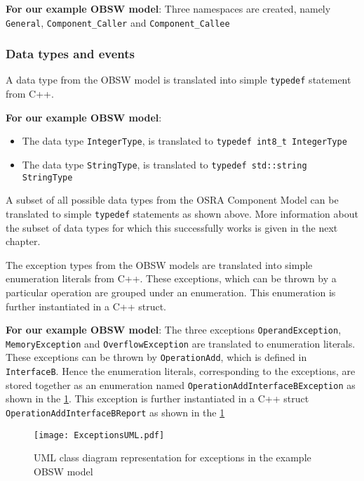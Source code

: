 \textbf{For our example OBSW model}: Three namespaces are created, namely \texttt{General}, \texttt{Component\_Caller} and \texttt{Component\_Callee} 

\subsubsection{\textbf{Data types and events}}
A data type from the OBSW model is translated into simple \texttt{typedef} statement from C++.

\textbf{For our example OBSW model}:
\begin{itemize}
\item The data type \texttt{IntegerType}, is translated to \texttt{typedef\allowbreak \ int8\_t IntegerType}
\item The data type \texttt{StringType}, is translated to \texttt{typedef\allowbreak \ std::string StringType} 
\end{itemize}

A subset of all possible data types from the OSRA Component Model can be translated to simple \texttt{typedef} statements as shown above. More information about the subset of data types for which this successfully works is given in the next chapter. 

The exception types from the OBSW models are translated into simple enumeration literals from C++. These exceptions, which can be thrown by a particular operation are grouped under an enumeration. This enumeration is further instantiated in a C++ struct.

\textbf{For our example OBSW model}: The three exceptions \texttt{Operand\allowbreak Exception}, \texttt{Memory\allowbreak Exception} and \texttt{Overflow\allowbreak Exception} are translated to enumeration literals. These exceptions can be thrown by \texttt{OperationAdd}, which is defined in \texttt{InterfaceB}. Hence the enumeration literals, corresponding to the exceptions, are stored together as an enumeration named \texttt{OperationAdd\allowbreak InterfaceB\allowbreak Exception} as shown in the \cref{fig: ExceptionsUML}. This exception is further instantiated in a C++ struct \texttt{OperationAdd\allowbreak InterfaceB\allowbreak Report} as shown in the \cref{fig: ExceptionsUML} 

\begin{figure}[h]
	\centering
	\texttt{[image: ExceptionsUML.pdf]}
	\caption{UML class diagram representation for exceptions in the example OBSW model}
	\label{fig: ExceptionsUML}
\end{figure}

